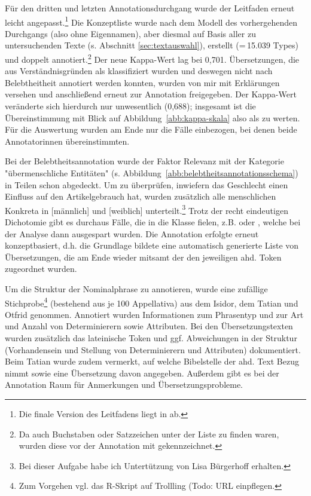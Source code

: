 Für den dritten und letzten Annotationsdurchgang wurde der Leitfaden erneut leicht angepasst.\footnote{Die finale Version des Leitfadens liegt in \textcite{HZKYL4_2020} ab.} Die Konzeptliste wurde nach dem Modell des vorhergehenden Durchgangs (also ohne Eigennamen), aber diesmal auf Basis aller zu untersuchenden Texte (s. Abschnitt \ref{sec:textauswahl}), erstellt (=\,15.039 Types) und doppelt annotiert.\footnote{Da auch Buchstaben oder Satzzeichen unter der Liste zu finden waren, wurden diese vor der Annotation mit  gekennzeichnet.} Der neue Kappa-Wert lag bei 0,701. Übersetzungen, die aus Verständnisgründen als  klassifiziert wurden und deswegen nicht nach Belebtheitheit annotiert werden konnten, wurden von mir mit Erklärungen versehen und anschließend erneut zur Annotation freigegeben. Der Kappa-Wert veränderte sich hierdurch nur unwesentlich (0,688); insgesamt ist die Übereinstimmung mit Blick auf Abbildung~\ref{abb:kappa-skala} also als   zu werten. Für die Auswertung wurden am Ende nur die Fälle einbezogen, bei denen beide Annotatorinnen übereinstimmten.


Bei der Belebtheitsannotation wurde der Faktor Relevanz mit der Kategorie "übermenschliche Entitäten" (s. Abbildung~\ref{abb:belebtheitsannotationsschema}) in Teilen schon abgedeckt. Um zu überprüfen, inwiefern das Geschlecht einen Einfluss auf den Artikelgebrauch hat, wurden zusätzlich alle menschlichen Konkreta in [männlich] und [weiblich] unterteilt.\footnote{Bei dieser Aufgabe habe ich Untertützung von Lisa Bürgerhoff erhalten.} 
Trotz der recht eindeutigen Dichotomie gibt es durchaus Fälle, die in die Klasse  fielen, z.B.  oder , welche bei der Analyse dann ausgespart wurden.  Die Annotation erfolgte erneut konzeptbasiert, d.h. die Grundlage bildete eine automatisch generierte Liste von Übersetzungen, die am Ende wieder mitsamt der  den jeweiligen ahd. Token zugeordnet wurden. 


Um die Struktur der Nominalphrase zu annotieren, wurde eine zufällige Stichprobe\footnote{Zum Vorgehen vgl. das R-Skript  auf Trollling (Todo: URL einpflegen.} (bestehend aus je 100 Appellativa) aus dem Isidor, dem Tatian und Otfrid genommen. Annotiert wurden Informationen zum Phrasentyp und zur Art und Anzahl von Determinierern sowie Attributen. 
Bei den Übersetzungstexten wurden zusätzlich das lateinische Token und ggf. Abweichungen in der Struktur (Vorhandensein und Stellung von Determinierern und Attributen) dokumentiert. Beim Tatian wurde zudem vermerkt, auf welche Bibelstelle der ahd. Text Bezug nimmt sowie eine Übersetzung davon angegeben. Außerdem gibt es bei der Annotation Raum für Anmerkungen und Übersetzungsprobleme.

